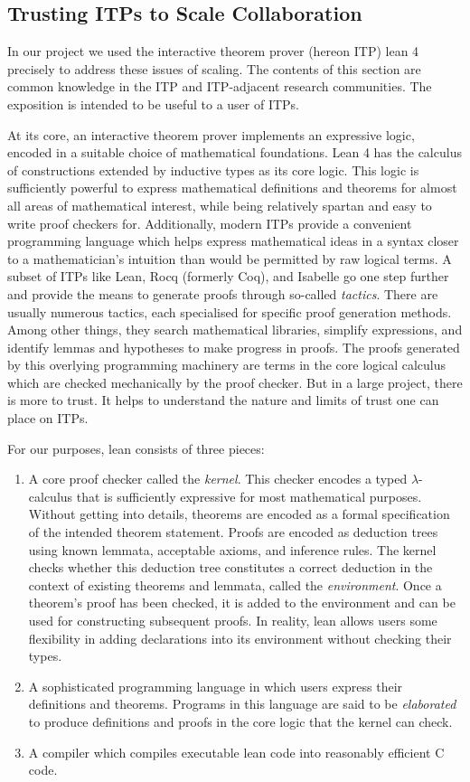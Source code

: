 \subsection{Trusting ITPs to Scale Collaboration}
In our project we used the interactive theorem prover (hereon ITP) lean 4 \cite{the_lean4_paper} precisely to address these issues of scaling. The contents of this section are common knowledge in the ITP and ITP-adjacent research communities. The exposition is intended to be useful to a user of ITPs.

At its core, an interactive theorem prover implements an expressive logic, encoded in a suitable choice of mathematical foundations. Lean 4 has the calculus of constructions extended by inductive types as its core logic. This logic is sufficiently powerful to express mathematical definitions and theorems for almost all areas of mathematical interest, while being relatively spartan and easy to write proof checkers for. Additionally, modern ITPs provide a convenient programming language which helps express mathematical ideas in a syntax closer to a mathematician's intuition than would be permitted by raw logical terms. A subset of ITPs like Lean, Rocq (formerly Coq), and Isabelle go one step further and provide the means to generate proofs through so-called \emph{tactics}. There are usually numerous tactics, each specialised for specific proof generation methods. Among other things, they search mathematical libraries, simplify expressions, and identify lemmas and hypotheses to make progress in proofs. The proofs generated by this overlying programming machinery are terms in the core logical calculus which are checked mechanically by the proof checker. But in a large project, there is more to trust. It helps to understand the nature and limits of trust one can place on ITPs.

For our purposes, lean consists of three pieces:
\begin{enumerate}
    \item A core proof checker called the \emph{kernel}. This checker encodes a typed $\lambda$-calculus that is sufficiently expressive for most mathematical purposes. Without getting into details, theorems are encoded as a formal specification of the intended theorem statement. Proofs are encoded as deduction trees using known lemmata, acceptable axioms, and inference rules. The kernel checks whether this deduction tree constitutes a correct deduction in the context of existing theorems and lemmata, called the \emph{environment}. Once a theorem's proof has been checked, it is added to the environment and can be used for constructing subsequent proofs. In reality, lean allows users some flexibility in adding declarations into its environment without checking their types.
    \item A sophisticated programming language in which users express their definitions and theorems. Programs in this language are said to  be \emph{elaborated} to produce definitions and proofs in the core logic that the kernel can check.
    \item A compiler which compiles executable lean code into reasonably efficient C code.
\end{enumerate}

